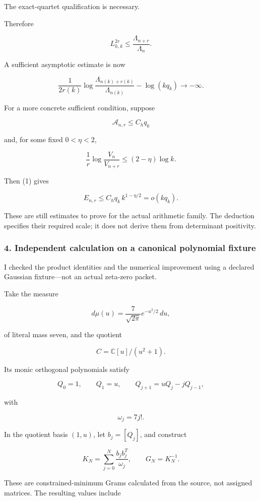 The exact-quartet qualification is necessary.

Therefore

\[
\boxed{
L_{h,k}^{2r}
\le
\frac{\Lambda_{n+r}}{\Lambda_n}.
}
\tag{15}
\]

A sufficient asymptotic estimate is now

\[
\boxed{
\frac{1}{2r(k)}
\log\frac{\Lambda_{n(k)+r(k)}}{\Lambda_{n(k)}}
-\log(kq_k)
\longrightarrow-\infty.
}
\tag{16}
\]

For a more concrete sufficient condition, suppose

\[
\mathcal A_{n,r}\le C_hq_k
\]

and, for some fixed \(0<\eta<2\),

\[
\frac1r\log\frac{V_n}{V_{n+r}}
\le(2-\eta)\log k.
\]

Then (1) gives

\[
E_{n,r}
\le C_hq_k\,k^{1-\eta/2}
=o(kq_k).
\tag{17}
\]

These are still estimates to prove for the actual arithmetic family. The deduction specifies their required scale; it does not derive them from determinant positivity.

\subsubsection{4. Independent calculation on a canonical polynomial fixture}\label{endpoint-user_product_original--independent-calculation-on-a-canonical-polynomial-fixture}

I checked the product identities and the numerical improvement using a declared Gaussian fixture---not an actual zeta-zero packet.

Take the measure

\[
d\mu(u)=\frac{7}{\sqrt{2\pi}}e^{-u^2/2}\,du,
\]

of literal mass seven, and the quotient

\[
C=\mathbb C[u]/(u^2+1).
\]

Its monic orthogonal polynomials satisfy

\[
Q_0=1,\qquad Q_1=u,\qquad
Q_{j+1}=uQ_j-jQ_{j-1},
\]

with

\[
\omega_j=7j!.
\]

In the quotient basis \((1,u)\), let \(b_j=[Q_j]\), and construct

\[
K_N=\sum_{j=0}^{N}\frac{b_jb_j^T}{\omega_j},
\qquad G_N=K_N^{-1}.
\]

These are constrained-minimum Grams calculated from the source, not assigned matrices. The resulting values include

